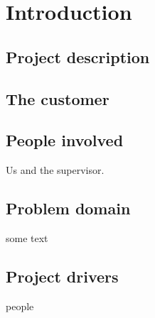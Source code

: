 
\chapter{Introduction} %

\label{Introduction} %



\section{Project description}


\section{The customer}

\section{People involved}

Us and the supervisor.




\section{Problem domain}
some text

\section{Project drivers}
people 
